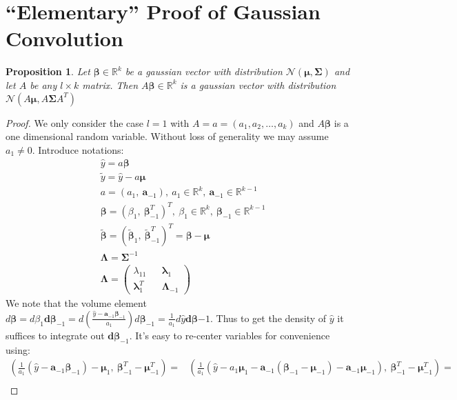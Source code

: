 \documentclass[10pt,fleqn]{amsart}
\newtheorem{proposition}[theorem]{Proposition}
\theoremstyle{definition}
\theoremstyle{remark}
\numberwithin{equation}{section}
\newcommand{\aaa}{\boldsymbol{a}}
\newcommand{\RR}{\mathbb{R}}
\newcommand{\bbeta}{\boldsymbol{\beta}}
\newcommand{\mmu}{\boldsymbol{\mu}}
\newcommand{\SSigma}{\boldsymbol{\Sigma}}
\newcommand{\llambda}{\boldsymbol{\lambda}}
\newcommand{\LLambda}{\boldsymbol{\Lambda}}
\newcommand{\bbetatilde}{\widetilde{\bbeta}}
\newcommand{\yhat}{\widehat{y}}
\newcommand{\ytilde}{\widetilde{y}}
\begin{document}
\appendix\section{``Elementary'' Proof of Gaussian Convolution}\label{appendix_gauss_conv}
\begin{proposition}
    Let $\bbeta\in\RR^k$ be a gaussian vector with distribution $\mathcal{N}(\mmu,\SSigma)$ and let $A$ be any $l\times k$ matrix.
    Then $A\bbeta\in\RR^k$ is a gaussian vector with distribution $\mathcal{N}(A\mmu,A\SSigma A^T)$
\end{proposition}
\begin{proof} We only consider the case $l=1$ with $A=a=(a_1, a_2,\ldots, a_k)$ and $A\bbeta$ is a one dimensional random variable.
Without loss of generality we may assume $a_1\neq 0$. Introduce notations:
\begin{align}
    &\yhat = a\bbeta\\
    &\ytilde=\yhat-a\mmu\\
    &a = \left(a_1,\ \aaa_{-1}\right),\ a_1\in\RR^k,\ \aaa_{-1}\in\RR^{k-1}\\
    &\bbeta = \left(\beta_1,\ \bbeta_{-1}^T\right)^T,\ \beta_1\in\RR^k,\ \bbeta_{-1}\in\RR^{k-1}\\
    &\bbetatilde=\left(\bbetatilde_1,\ \bbetatilde_{-1}^T\right)^T=\bbeta-\mmu\\
    &\LLambda=\SSigma^{-1}\\
    &\LLambda=\left(\begin{matrix}
        \lambda_{11} && \llambda_1\\
        \llambda_1^T && \LLambda_{-1}
    \end{matrix}\right)
\end{align}
We note that the volume element
$\displaystyle d\bbeta=d\beta_1\boldsymbol{d}\bbeta_{-1}=d\left(\frac{\yhat-\aaa_{-1}\bbeta_{-1}}{a_1}\right)d\bbeta_{-1}=\frac 1{a_1}d\yhat\boldsymbol{d}\bbeta{-1}$.
Thus to get the density of $\yhat$ it suffices to integrate out $\boldsymbol{d}\bbeta_{-1}$. It's easy to re-center variables for convenience using:
\begin{equation*}\begin{split}
    \left(\frac{1}{a_1}\left(\yhat-\aaa_{-1}\bbeta_{-1}\right)-\mmu_1,\ \bbeta_{-1}^T-\mmu_{-1}^T\right)=&\left(\frac{1}{a_1}\left(\yhat-a_1\mmu_1-\aaa_{-1}\left(\bbeta_{-1}-\mmu_{-1}\right)-\aaa_{-1}\mmu_{-1}\right),\ \bbeta_{-1}^T-\mmu_{-1}^T\right)=\\

\end{split}
\end{equation*}
\end{proof}
\end{document}
